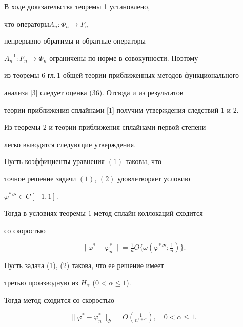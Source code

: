 \begin{pf} 


В ходе доказательства теоремы 1 установлено, 


что операторы\linebreak $A_n:\Phi_n\to F_n$ 


непрерывно обратимы и обратные операторы 


$A^{-1}_n:F_n\to\Phi_n$ ограничены по норме в совокупности. Поэтому 


из теоремы 6 гл.\,1 общей теории приближенных методов функционального 


анализа [3] следует оценка (36). Отсюда и из результатов 


теории приближения сплайнами [1] получим утверждения следствий 1 и 2. 


\end{pf} 


 


Из теоремы 2 и теории приближения сплайнами первой степени 


легко выводятся следующие утверждения. 


 


\begin{thm} 


Пусть коэффициенты уравнения $(1)$ таковы, что 


точное решение задачи $(1)$, $(2)$ удовлетворяет условию 


$\varphi^*{}'''\in C[-1,1]$. 


 


Тогда в условиях теоремы $1$ метод сплайн-коллокаций сходится 


со скоростью 


$$ 


\|\varphi^*-\varphi^*_n\|=\tfrac{1}{n}O\{\omega(\varphi^*{}'''; 


\tfrac{1}{n})\}. 


$$ 


\end{thm} 


\addtocounter{cor}{-2}


 


\begin{cor} 


Пусть задача (1), (2) такова, что ее решение имеет 


третью производную из $H_\alpha$ ($0<\alpha\le1$). 


 


Тогда метод сходится со скоростью 


$$ 


\|\varphi^*-\varphi^*_n\|_\Phi=O(\tfrac{1}{n^{1+\alpha}}),\quad 


0<\alpha\le1. 


$$ 


\end{cor} 



